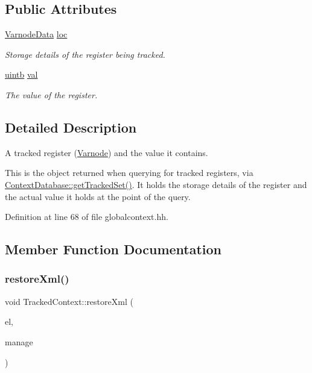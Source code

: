 \subsection*{Public Attributes}
\begin{DoxyCompactItemize}
\item 
\mbox{\hyperlink{struct_varnode_data}{Varnode\+Data}} \mbox{\hyperlink{struct_tracked_context_aa0b1520b744217f2f9887a71c7422c41}{loc}}
\begin{DoxyCompactList}\small\item\em Storage details of the register being tracked. \end{DoxyCompactList}\item 
\mbox{\hyperlink{types_8h_a2db313c5d32a12b01d26ac9b3bca178f}{uintb}} \mbox{\hyperlink{struct_tracked_context_a7ced282753847ba1cc462d4233fbb3e7}{val}}
\begin{DoxyCompactList}\small\item\em The value of the register. \end{DoxyCompactList}\end{DoxyCompactItemize}


\subsection{Detailed Description}
A tracked register (\mbox{\hyperlink{class_varnode}{Varnode}}) and the value it contains. 

This is the object returned when querying for tracked registers, via \mbox{\hyperlink{class_context_database_a6ea1e4b793286c0b1ecbafcc58422339}{Context\+Database\+::get\+Tracked\+Set()}}. It holds the storage details of the register and the actual value it holds at the point of the query. 

Definition at line 68 of file globalcontext.\+hh.



\subsection{Member Function Documentation}
\mbox{\label{struct_tracked_context_acd6122fcdd019c3a1d0be1983400424e}} 
\subsubsection{\texorpdfstring{restoreXml()}{restoreXml()}}
{\footnotesize\ttfamily void Tracked\+Context\+::restore\+Xml (\begin{DoxyParamCaption}\item[{const \mbox{\hyperlink{class_element}{Element}} $\ast$}]{el,  }\item[{const \mbox{\hyperlink{class_addr_space_manager}{Addr\+Space\+Manager}} $\ast$}]{manage }\end{DoxyParamCaption})}



